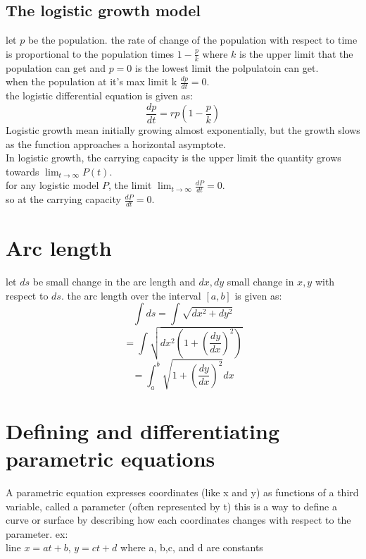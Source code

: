 \documentclass{article}
\begin{document}
                            \subsection{The logistic growth model}
                                let \(p\) be the population. 
                                the  rate of change of the population with respect to time is proportional to the population times \(1 - \frac{p}{k}\) where  \(k\) is the upper limit that the population can get and \(p = 0\) is the lowest limit the polpulatoin can get.\\
                                when the population at it's max limit k \(\frac{dp}{dt} = 0\). \\ 
                                the logistic differential equation is given as: 
                                \[\frac{dp}{dt} = rp(1 - \frac{p}{k})\]
                                Logistic growth mean initially growing almost exponentially, but the growth slows as the function approaches a horizontal asymptote.\\ 
                                In logistic growth, the carrying capacity is the upper limit the quantity grows towards \(\lim_{t \to \infty} P(t)\).\\
                                for any logistic model \(P\), the limit  \(\lim_{t \to \infty} \frac{dP}{dt} = 0\).\\ 
                                so  at the carrying capacity \(\frac{dP}{dt} = 0 \). 
                \section{Arc length}
                    let \(ds\) be small change in the arc length and \(dx, dy\) small change in \(x, y\) with respect to \(ds\).
                    the arc length over the interval \([a, b]\) is given as: 
                    \[\int ds = \int \sqrt{dx^2  + dy^2}\]
                    \[= \int \sqrt{dx^2 (1 + {(\frac{dy}{dx})}^2)}\]
                    \[\boxed{= \int_{a}^{b} \sqrt{1 + {(\frac{dy}{dx})}^2} dx}\]
                \section{Defining and differentiating parametric equations}
                    A parametric equation expresses coordinates (like x and y) as functions of a third variable, called a parameter (often represented by t) this is a way to define a curve or surface by describing how each coordinates changes with respect to the parameter. 
                    ex: \\
                    line \(x = at + b\), \(y = ct + d\) where a, b,c, and d are constants 
\end{document}
